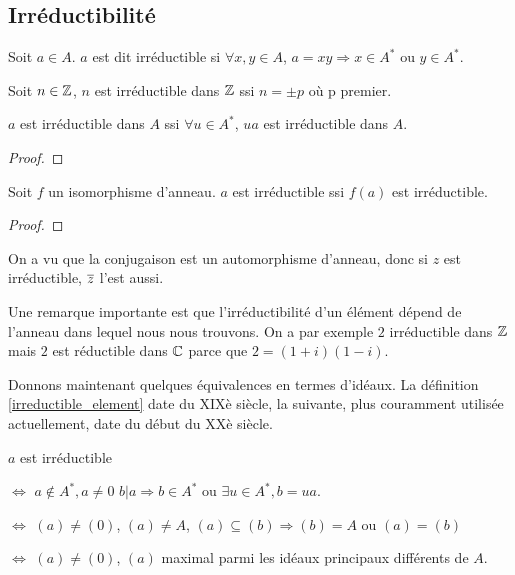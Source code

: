 \subsection{Irréductibilité}

\begin{definition} 
	Soit $a \in A$. $a$ est dit irréductible si $\forall x, y \in A$, $a = xy
	\Rightarrow x \in A^{*}$ ou $y \in A^{*}$.
	\label{irreductible_element}
\end{definition}

\begin{exemple}
	Soit $n \in \mathbb{Z}$, $n$ est irréductible dans $\mathbb{Z}$ ssi $n = \pm p$
	où p premier.
\end{exemple}

\begin{proposition}
	$a$ est irréductible dans $A$ ssi $\forall u \in A^{*}$, $ua$ est
	irréductible dans $A$.
\end{proposition}

\ifdefined\outputproof
\begin{proof}

\end{proof}
\fi

\begin{proposition}
	Soit $f$ un isomorphisme d'anneau. $a$ est irréductible ssi $f(a)$ est
	irréductible.
\end{proposition}

\ifdefined\outputproof
\begin{proof}

\end{proof}
\fi

\begin{exemple}
	On a vu que la conjugaison est un automorphisme d'anneau, donc si $z$ est
	irréductible, $\overline{z}$ l'est aussi.
\end{exemple}

Une remarque importante est que l'irréductibilité d'un élément dépend de l'anneau
dans lequel nous nous trouvons. On a par exemple $2$ irréductible dans
$\mathbb{Z}$ mais $2$ est réductible dans $\mathbb{C}$ parce que $2 = (1 + i) (1 -
i)$.

Donnons maintenant quelques équivalences en termes d'idéaux. La définition
\ref{irreductible_element} date du XIXè siècle, la suivante, plus couramment
utilisée actuellement, date du début du XXè siècle.

\begin{proposition}

	$a$ est irréductible

	$\Leftrightarrow$
	$a \notin A^{*}, a \ne 0$ $b | a \Rightarrow b \in A^{*}$ ou $\exists u \in
	A^{*}, b = ua$.

	$\Leftrightarrow$
	$(a) \ne (0)$, $(a) \ne A$, $(a) \subseteq (b) \Rightarrow (b) = A$ ou $(a)
	= (b)$

	$\Leftrightarrow$
	$(a) \ne (0)$, $(a)$ maximal parmi les idéaux principaux différents de $A$.
\end{proposition}

